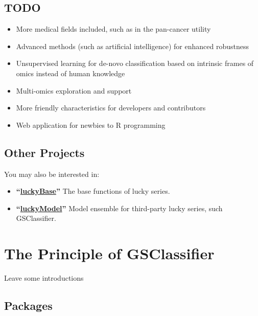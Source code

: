 \documentclass[
  12pt,
]{book}
\begin{document}
\hypertarget{todo}{%
\section*{TODO}\label{todo}}

\begin{itemize}
\item
  More medical fields included, such as in the pan-cancer utility
\item
  Advanced methods (such as artificial intelligence) for enhanced robustness
\item
  Unsupervised learning for de-novo classification based on intrinsic frames of omics instead of human knowledge
\item
  Multi-omics exploration and support
\item
  More friendly characteristics for developers and contributors
\item
  Web application for newbies to R programming
\end{itemize}

\hypertarget{other-projects}{%
\section*{Other Projects}\label{other-projects}}

You may also be interested in:

\begin{itemize}
\item
  \textbf{``\href{https://github.com/huangwb8/luckyBase}{luckyBase}''} The base functions of lucky series.
\item
  \textbf{``\href{https://github.com/huangwb8/luckyModel}{luckyModel}''} Model ensemble for third-party lucky series, such GSClassifier.
\end{itemize}

\hypertarget{the-principle-of-gsclassifier}{%
\chapter{The Principle of GSClassifier}\label{the-principle-of-gsclassifier}}

Leave some introductions

\hypertarget{packages}{%
\section{Packages}\label{packages}}
\end{document}
